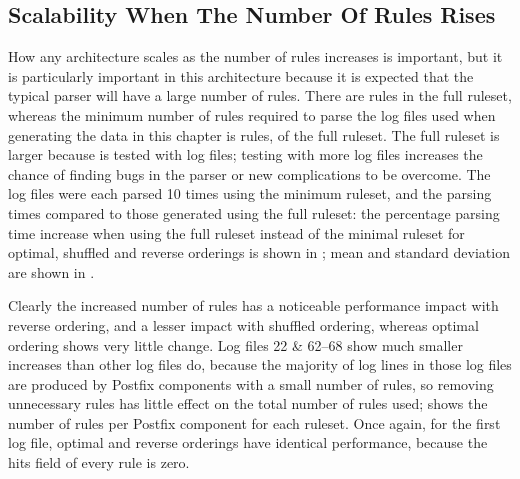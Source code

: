 
\FloatBarrier{}

\subsection{Scalability When The Number Of Rules Rises}

\label{scalability as the number of rules rises}

How any architecture scales as the number of rules increases is important,
but it is particularly important in this architecture because it is
expected that the typical parser will have a large number of rules.  There
are \numberOFrules{} rules in the full \parsername{} ruleset, whereas the
minimum number of rules required to parse the \numberOFlogFILES{} log files
used when generating the data in this chapter is \numberOFrulesMINIMUM{}
rules, \numberOFrulesMINIMUMpercentage{} of the full ruleset.  The full
ruleset is larger because \parsername{} is tested with
\numberOFlogFILESall{} log files; testing with more log files increases the
chance of finding bugs in the parser or new complications to be overcome.
The \numberOFlogFILES{} log files were each parsed 10 times using the
minimum ruleset, and the parsing times compared to those generated using
the full ruleset: the percentage parsing time increase when using the full
ruleset instead of the minimal ruleset for optimal, shuffled and reverse
orderings is shown in ; mean and standard deviation are shown in
.

Clearly the increased number of rules has a noticeable performance impact
with reverse ordering, and a lesser impact with shuffled ordering, whereas
optimal ordering shows very little change.  Log files 22 \& 62--68 show
much smaller increases than other log files do, because the majority of log
lines in those log files are produced by Postfix components with a small
number of rules, so removing unnecessary rules has little effect on the
total number of rules used;  shows the number of rules per Postfix
component for each ruleset.  Once again, for the first log file, optimal
and reverse orderings have identical performance, because the hits field of
every rule is zero.

